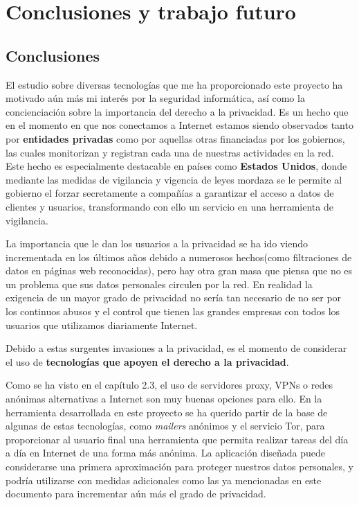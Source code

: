 \chapter{Conclusiones y trabajo futuro}
\label{chap:conclusiones}
\section{Conclusiones}
El estudio sobre diversas tecnologías que me ha proporcionado este
proyecto ha motivado aún más mi interés por la seguridad informática,
así como la concienciación sobre la importancia del derecho a la
privacidad.  Es un hecho que en el momento en que nos conectamos a
Internet estamos siendo observados tanto por \textbf{entidades
  privadas} como por aquellas otras financiadas por los gobiernos, las
cuales monitorizan y registran cada una de nuestras actividades en la
red. Este hecho es especialmente destacable en países como
\textbf{Estados Unidos}, donde mediante las medidas de vigilancia y
vigencia de leyes mordaza se le permite al gobierno el forzar
secretamente a compañías a garantizar el acceso a datos de clientes y
usuarios, transformando con ello un servicio en una herramienta de
vigilancia.

La importancia que le dan los usuarios a la privacidad se ha ido
viendo incrementada en los últimos años debido a numerosos hechos(como
filtraciones de datos en páginas web reconocidas), pero hay otra gran
masa que piensa que no es un problema que sus datos personales
circulen por la red.  En realidad la exigencia de un mayor grado de
privacidad no sería tan necesario de no ser por los continuos abusos y
el control que tienen las grandes empresas con todos los usuarios que
utilizamos diariamente Internet.

Debido a estas surgentes invasiones a la privacidad, es el momento de
considerar el uso de \textbf{tecnologías que apoyen el derecho a la
  privacidad}.

Como se ha visto en el capítulo 2.3, el uso de servidores proxy, VPNs
o redes anónimas alternativas a Internet son muy buenas opciones para
ello. En la herramienta desarrollada en este proyecto se ha querido
partir de la base de algunas de estas tecnologías, como
\textit{mailers }anónimos y el servicio Tor, para proporcionar al
usuario final una herramienta que permita realizar tareas del día a
día en Internet de una forma más anónima.  La aplicación diseñada
puede considerarse una primera aproximación para proteger nuestros
datos personales, y podría utilizarse con medidas adicionales como las
ya mencionadas en este documento para incrementar aún más el grado de
privacidad.

